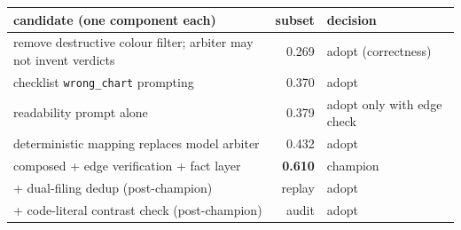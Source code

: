 \documentclass[11pt]{article}
\begin{document}
\begin{center}
\begin{tabular}{p{8.2cm}rl}
\toprule
candidate (one component each) & subset & decision \\
\midrule
remove destructive colour filter; arbiter may not invent verdicts & 0.269 & adopt (correctness) \\
checklist \texttt{wrong\_chart} prompting & 0.370 & adopt \\
readability prompt alone & 0.379 & adopt only with edge check \\
deterministic mapping replaces model arbiter & 0.432 & adopt \\
composed + edge verification + fact layer & \textbf{0.610} & champion \\
\quad + dual-filing dedup (post-champion) & replay & adopt \\
\quad + code-literal contrast check (post-champion) & audit & adopt \\
\bottomrule
\end{tabular}
\end{center}
\end{document}
